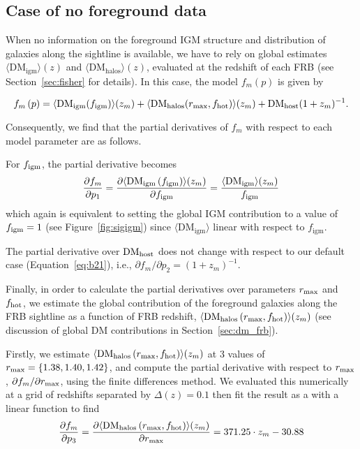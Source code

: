 \documentclass[twocolumn]{aastex63}
\newcommand{\dmhalo}{\ensuremath{\mathrm{DM}_\mathrm{halos}}}
\newcommand{\dmigm}{\ensuremath{\mathrm{DM}_\mathrm{igm}}}
\newcommand{\figm}{\ensuremath{f_\mathrm{igm}}}
\newcommand{\fhot}{\ensuremath{f_\mathrm{hot}}}
\newcommand{\rmax}{\ensuremath{r_\mathrm{max}}}
\begin{document}
\begin{CJK*}{UTF8}{gbsn}
\subsection{Case of no foreground data}

When no information on the foreground IGM structure and distribution of galaxies along the sightline is available, we have to rely on global estimates $\langle \dmigm \rangle(z)$ and $\langle \dmhalo \rangle (z)$, evaluated at the redshift of each FRB (see Section~\ref{sec:fisher} for details). In this case, the model $f_m\left(p\right)$ is given by 

\begin{equation}
    f_m\left(p\right) = \langle {\rm DM}_\mathrm{igm}(\figm) \rangle (z_m) \nonumber  + \langle \mathrm{DM}_\mathrm{halos}(\rmax, \fhot) \rangle (z_m) \nonumber +  \mathrm{DM_{host}}(1+z_m)^{-1}.
\end{equation}

Consequently, we find that the partial derivatives of $f_m$ with respect to each model parameter are as follows.

For $f_{\rm igm}$, the partial derivative becomes 
\begin{equation}
    \frac{\partial f_m}{\partial p_1} = \frac{\partial \langle {\rm DM}_{\rm igm} \left( f_{\rm igm} \right) \rangle (z_m)}{ \partial f_{\rm igm}} =  \frac{\langle {\rm DM}_{\rm igm} \rangle (z_m)}{\figm}
\end{equation}
which again is equivalent to setting 
the global IGM contribution to a value of $f_{\rm igm} = 1$ (see Figure~\ref{fig:sigigm})
since $\langle \dmigm \rangle$ linear with respect to \figm.

The partial derivative over ${\rm DM_{host}}$ does not change with respect to our default case (Equation~\ref{eq:b21}), i.e., $\partial f_m \slash \partial p_2 = \left( 1 + z_m \right)^{-1}$.

Finally, in order to calculate the partial derivatives over parameters $r_{\rm max}$ and $f_{\rm hot}$, we estimate the global contribution of the foreground galaxies along the FRB sightline as a function of FRB redshift, $\langle {\rm DM_{halos}}\left( r_{\rm max}, f_{\rm hot} \right) \rangle (z_m)$ (see discussion of global DM contributions in Section~\ref{sec:dm_frb}). 

Firstly, we estimate $\langle {\rm DM_{halos}}\left( r_{\rm max}, f_{\rm hot} \right) \rangle (z_m)$ at 3 values of $r_{\rm max} = \{ 1.38, 1.40, 1.42 \} $, and compute the partial derivative with respect to $r_{\rm max}$, $\partial f_m \slash \partial r_{\rm max}$, using the finite differences method. We evaluated this numerically at a grid of redshifts separated by $\Delta (z) = 0.1$ then fit the result as a with a linear function to find 
\begin{equation}
    \frac{\partial f_m}{ \partial p_3} = \frac{\partial \langle {\rm DM_{halos}}\left(r_{\rm max}, f_{\rm hot}\right)\rangle (z_m) }{\partial r_{\rm max}} = 371.25 \cdot z_m - 30.88
\end{equation}


\end{CJK*}
\end{document}
